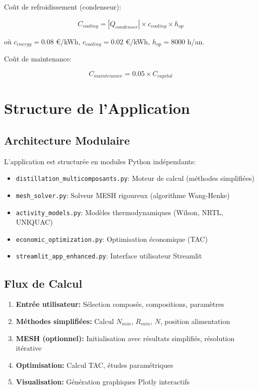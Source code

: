 \documentclass[11pt,a4paper]{article}
\begin{document}
Coût de refroidissement (condenseur):

\begin{equation}
C_{cooling} = |Q_{condenser}| \times c_{cooling} \times h_{op}
\end{equation}

où $c_{energy} = 0.08$ €/kWh, $c_{cooling} = 0.02$ €/kWh, $h_{op} = 8000$ h/an.

Coût de maintenance:

\begin{equation}
C_{maintenance} = 0.05 \times C_{capital}
\end{equation}

\section{Structure de l'Application}

\subsection{Architecture Modulaire}

L'application est structurée en modules Python indépendants:

\begin{itemize}[leftmargin=*]
    \item \texttt{distillation\_multicomposants.py}: Moteur de calcul (méthodes simplifiées)
    \item \texttt{mesh\_solver.py}: Solveur MESH rigoureux (algorithme Wang-Henke)
    \item \texttt{activity\_models.py}: Modèles thermodynamiques (Wilson, NRTL, UNIQUAC)
    \item \texttt{economic\_optimization.py}: Optimisation économique (TAC)
    \item \texttt{streamlit\_app\_enhanced.py}: Interface utilisateur Streamlit
\end{itemize}

\subsection{Flux de Calcul}

\begin{enumerate}[leftmargin=*]
    \item \textbf{Entrée utilisateur:} Sélection composés, compositions, paramètres
    \item \textbf{Méthodes simplifiées:} Calcul $N_{min}$, $R_{min}$, $N$, position alimentation
    \item \textbf{MESH (optionnel):} Initialisation avec résultats simplifiés, résolution itérative
    \item \textbf{Optimisation:} Calcul TAC, études paramétriques
    \item \textbf{Visualisation:} Génération graphiques Plotly interactifs
\end{enumerate}
\end{document}

